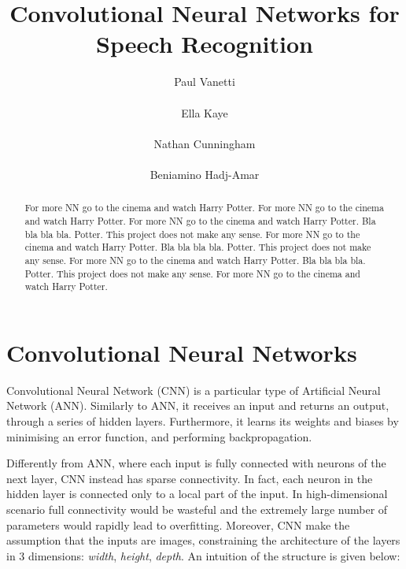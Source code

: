 \documentclass{article} %
\title{Convolutional Neural Networks for Speech Recognition}
\author{
Paul Vanetti \\
\texttt{} \\
\And
Ella Kaye \\
\texttt{} \\
\And
Nathan Cunningham \\
\texttt{} \\
\And
Beniamino Hadj-Amar \\
\texttt{}
}
\begin{document}
\maketitle

\begin{abstract}
For more NN go to the cinema and watch Harry Potter.  For more NN go to the cinema and watch Harry Potter. For more NN go to the cinema and watch Harry Potter. 
Bla bla bla bla. Potter. This project does not make any sense. For more NN go to the cinema and watch Harry Potter. Bla bla bla bla. Potter. This project does not make any sense. For more NN go to the cinema and watch Harry Potter. Bla bla bla bla. Potter. This project does not make any sense. For more NN go to the cinema and watch Harry Potter.
\end{abstract}


\vspace{0.7cm}
\section{Convolutional Neural Networks}
Convolutional Neural Network (CNN) is a particular type of Artificial Neural Network (ANN). Similarly to ANN, it receives an input and returns an output, through a series of hidden layers. Furthermore, it learns its weights and biases by minimising an error function, and performing backpropagation. 

Differently from ANN, where each input is fully connected with neurons of the next layer, CNN instead has sparse connectivity. In fact, each neuron in the hidden layer is connected only to a local part of the input. In high-dimensional scenario full connectivity would be wasteful and the extremely large number of parameters would rapidly lead to overfitting. Moreover, CNN make the assumption that the inputs are images, constraining the architecture of the layers in 3 dimensions: \textit{width}, \textit{height}, \textit{depth}. An intuition of the structure is given below:
\end{document}
